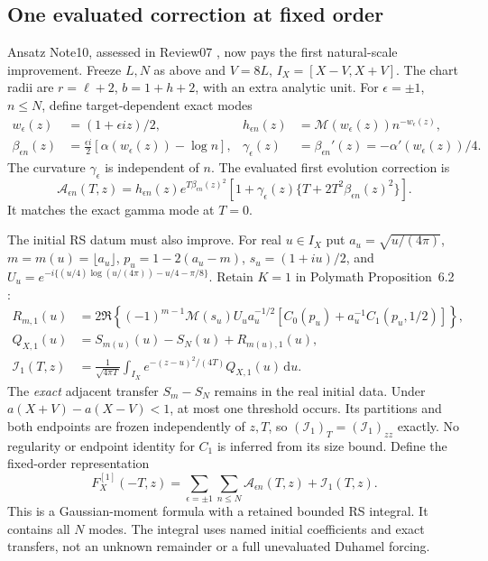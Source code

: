 \documentclass[11pt]{article}
\newcommand{\dd}{\,\mathrm d}
\newcommand{\Mc}{\mathcal M}
\numberwithin{equation}{section}
\begin{document}
\subsection{One evaluated correction at fixed order}
\label{sec:negative-first-correction}
Ansatz Note10, assessed in Review07 \cite{ansatz10,review07}, now pays
the first natural-scale improvement. Freeze \(L,N\) as above and
\(V=8L\), \(I_X=[X-V,X+V]\). The chart radii are
\(r=\ell+2\), \(b=1+h+2\), with an extra analytic unit.
For \(\epsilon=\pm1\), \(n\le N\), define target-dependent exact modes
\begin{align}
 w_\epsilon(z)&=(1+\epsilon iz)/2,&
 h_{\epsilon n}(z)&=\Mc(w_\epsilon(z))n^{-w_\epsilon(z)},\\
 \beta_{\epsilon n}(z)&=\frac{\epsilon i}{2}
             [\alpha(w_\epsilon(z))-\log n],&
 \gamma_\epsilon(z)&=\beta_{\epsilon n}'(z)
                    =-\alpha'(w_\epsilon(z))/4.
 \label{eq:first-mode-data}
\end{align}
The curvature \(\gamma_\epsilon\) is independent of \(n\).
The evaluated first evolution correction is
\begin{equation}
 \mathcal A_{\epsilon n}(T,z)
 =h_{\epsilon n}(z)e^{T\beta_{\epsilon n}(z)^2}
 \left[1+\gamma_\epsilon(z)
          \{T+2T^2\beta_{\epsilon n}(z)^2\}\right].
 \label{eq:first-evaluated-correction}
\end{equation}
It matches the exact gamma mode at \(T=0\).

The initial RS datum must also improve. For real \(u\in I_X\) put
\(a_u=\sqrt{u/(4\pi)}\), \(m=m(u)=\lfloor a_u\rfloor\),
\(p_u=1-2(a_u-m)\), \(s_u=(1+iu)/2\), and
\(U_u=e^{-i\{(u/4)\log(u/(4\pi))-u/4-\pi/8\}}\).
Retain \(K=1\) in Polymath Proposition~6.2 \cite{polymath}:
\begin{align}
 R_{m,1}(u)&=2\Re\left\{(-1)^{m-1}\Mc(s_u)U_u a_u^{-1/2}
              [C_0(p_u)+a_u^{-1}C_1(p_u,1/2)]\right\},\\
 Q_{X,1}(u)&=S_{m(u)}(u)-S_N(u)+R_{m(u),1}(u),\\
 \mathcal I_1(T,z)&=\frac1{\sqrt{4\pi T}}\int_{I_X}
                 e^{-(z-u)^2/(4T)}Q_{X,1}(u)\dd u.
 \label{eq:first-rs-integral}
\end{align}
The \emph{exact} adjacent transfer \(S_m-S_N\) remains in the real
initial data. Under \(a(X+V)-a(X-V)<1\), at most one threshold occurs.
Its partitions and both endpoints are frozen independently of \(z,T\),
so \((\mathcal I_1)_T=(\mathcal I_1)_{zz}\) exactly. No regularity or
endpoint identity for \(C_1\) is inferred from its size bound.
Define the fixed-order representation
\begin{equation}
 F_X^{[1]}(-T,z)=\sum_{\epsilon=\pm1}\sum_{n\le N}
                  \mathcal A_{\epsilon n}(T,z)+\mathcal I_1(T,z).
 \label{eq:first-negative-model}
\end{equation}
This is a Gaussian-moment formula with a retained bounded RS integral.
It contains all \(N\) modes. The integral uses named initial
coefficients and exact transfers, not an unknown remainder or a full
unevaluated Duhamel forcing.
\end{document}
